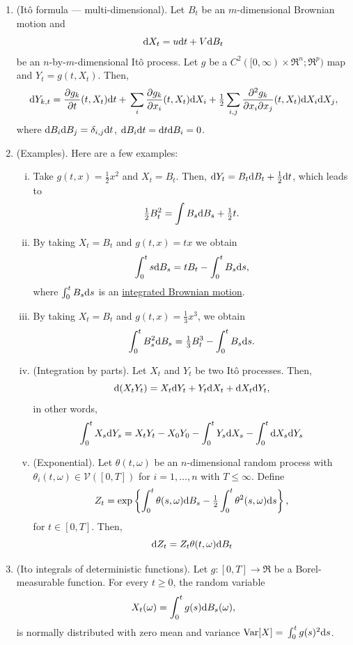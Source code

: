 \documentclass[a4paper,10pt]{scrbook}
\begin{document}
\begin{enumerate}
       
 \item (It\^{o} formula --- multi-dimensional).
       Let \(B_t\) be an \(m\)-dimensional Brownian motion and 
       \[
        \mathrm{d} X_t = u \mathrm{d} t + V \mathrm{d} B_t
       \]
       be an \(n\)-by-\(m\)-dimensional It\^{o} process. Let \(g\) be a \(C^2([0,\infty)\times \Re^n; \Re^p)\)
       map and \(Y_t = g(t, X_t)\). Then,
       \[
	    \mathrm{d} Y_{k, t} 
        {}={} 
	    \frac{\partial g_{k}}{\partial t}(t, X_t) \mathrm{d} t
	{}+{}
	    \sum_{i}\frac{\partial g_k}{\partial x_i}(t, X_t) \mathrm{d} X_i
	{}+{}
	    \tfrac{1}{2}\sum_{i,j}\frac{\partial^2 g_k}{\partial x_i \partial x_j}(t, X_t)\mathrm{d} X_i \mathrm{d} X_j,
       \]
       where \(\mathrm{d} B_i \mathrm{d} B_j = \delta_{i,j}\mathrm{d} t\), \(\mathrm{d} B_i \mathrm{d} t = \mathrm{d} t \mathrm{d} B_i = 0\).

       
 \item (Examples). Here are a few examples:
 \begin{enumerate}[i.]
  \item Take \(g(t,x)=\tfrac{1}{2}x^2\) and \(X_t = B_t\). Then, \(\mathrm{d} Y_t = B_t \mathrm{d} B_t + \tfrac{1}{2}\mathrm{d} t\), 
        which leads to 
        \[
         \tfrac{1}{2} B_t^2 = \int B_s \mathrm{d} B_s + \tfrac{1}{2}t.
        \]
  \item By taking \(X_t = B_t\) and \(g(t,x) = tx\) we obtain 
  \[
   \int_0^t s \mathrm{d} B_s = tB_t - \int_0^t B_s \mathrm{d} s,
  \]
  where \(\int_0^t B_s \mathrm{d} s\) is an \hyperlink{link:ibm}{integrated Brownian motion}.
 \item By taking \(X_t = B_t\) and \(g(t,x) = \tfrac{1}{3}x^3\), we obtain 
 \[
  \int_0^t B_s^2 \mathrm{d} B_s = \tfrac{1}{3}B_t^3 - \int_0^t B_s \mathrm{d} s.
 \]
 \item (Integration by parts). Let \(X_t\) and \(Y_t\) be two It\^{o} processes. 
       Then,
       \[
        \mathrm{d}(X_t Y_t) = X_t \mathrm{d} Y_t + Y_t \mathrm{d} X_t + \mathrm{d} X_t \mathrm{d} Y_t,
       \]
       in other words,
       \[
        \int_0^t X_s \mathrm{d} Y_s = X_t Y_t - X_0 Y_0 - \int_0^t Y_s \mathrm{d} X_s - \int_0^t \mathrm{d} X_s \mathrm{d} Y_s
       \]
 \item (Exponential). Let \(\theta(t, \omega)\) be an \(n\)-dimensional random process
       with \(\theta_i(t,\omega) \in \mathcal{V}([0,T])\) for \(i=1,\ldots, n\) with \(T\leq \infty\).
       Define 
       \[
        Z_t = \exp \left\{ 
        \int_0^t \theta(s,\omega) \mathrm{d} B_s 
        {}-{}
        \tfrac{1}{2}\int_0^t \theta^2 (s,\omega) \mathrm{d} s
        \right\},
       \]
       for \(t\in [0,T]\). Then,
       \[
        \mathrm{d} Z_t = Z_t \theta(t, \omega) \mathrm{d} B_t
       \]
 \end{enumerate}
 \item (Ito integrals of deterministic functions). 
 Let $g:[0, T]\to\Re$ be a Borel-measurable function. For every $t\geq 0$, the random variable 
 \[
  X_t(\omega) = \int_0^t g(s) \mathrm{d} B_s(\omega),
 \]
 is normally distributed with zero mean and variance 
 $\mathrm{Var}[X]{}={} \int_0^t g(s)^2 \mathrm{d} s$.


\end{enumerate}
\end{document}
